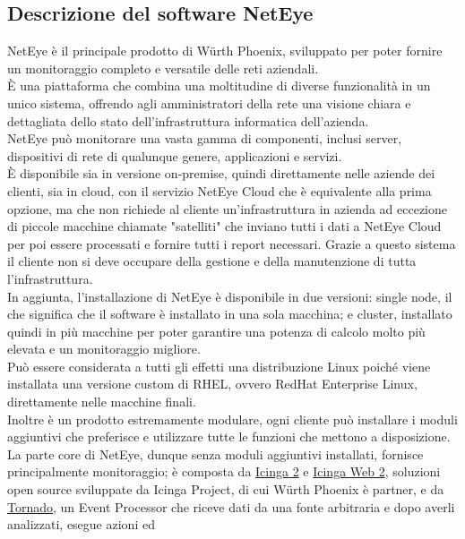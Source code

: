 \subsection{Descrizione del software NetEye}
\label{sub:neteye} NetEye è il principale prodotto di Würth Phoenix, sviluppato per
poter fornire un monitoraggio completo e versatile delle reti aziendali.\\ È una
piattaforma che combina una moltitudine di diverse funzionalità in un unico sistema,
offrendo agli amministratori della rete una visione chiara e dettagliata dello
stato dell'infrastruttura informatica dell'azienda.\\ NetEye può monitorare una
vasta gamma di componenti, inclusi server, dispositivi di rete di qualunque
genere, applicazioni e servizi.\\ È disponibile sia in versione on-premise,
quindi direttamente nelle aziende dei clienti, sia in cloud, con il servizio
NetEye Cloud che è equivalente alla prima opzione, ma che non richiede al cliente
un'infrastruttura in azienda ad eccezione di piccole macchine chiamate "satelliti"
che inviano tutti i dati a NetEye Cloud per poi essere processati e fornire tutti
i report necessari. Grazie a questo sistema il cliente non si deve occupare
della gestione e della manutenzione di tutta l'infrastruttura.\\ In aggiunta, l'installazione
di NetEye è disponibile in due versioni: single node, il che significa che il software
è installato in una sola macchina; e cluster, installato quindi in più macchine per
poter garantire una potenza di calcolo molto più elevata e un monitoraggio migliore.\\
Può essere considerata a tutti gli effetti una distribuzione Linux poiché viene installata
una versione custom di RHEL, ovvero RedHat Enterprise Linux, direttamente nelle macchine
finali.\\ Inoltre è un prodotto estremamente modulare, ogni cliente può
installare i moduli aggiuntivi che preferisce e utilizzare tutte le funzioni che
mettono a disposizione.\\ La parte core di NetEye, dunque senza moduli aggiuntivi
installati, fornisce principalmente monitoraggio; è composta da \href{https://github.com/Icinga/icinga2}{Icinga
2} e \href{https://github.com/Icinga/icingaweb2}{Icinga Web 2}, soluzioni open
source sviluppate da Icinga Project, di cui Würth Phoenix è partner, e da
\href{https://github.com/WuerthPhoenix/tornado}{Tornado}, un Event Processor che
riceve dati da una fonte arbitraria e dopo averli analizzati, esegue azioni ed
